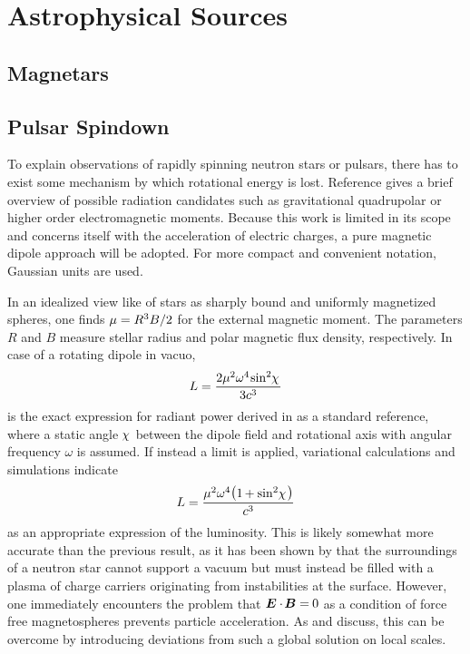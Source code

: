 \section{Astrophysical Sources}
\label{sec:sources}



\subsection{Magnetars}
\label{sub:magnetars}



\subsection{Pulsar Spindown}
\label{sub:spindown}

To explain observations of rapidly spinning neutron stars or pulsars, there has to exist some mechanism by which rotational energy is
lost. Reference \cite{Alvarez_2004} gives a brief overview of possible radiation candidates such as gravitational quadrupolar or
higher order electromagnetic moments. Because this work is limited in its scope and concerns itself with the acceleration of
electric charges, a pure magnetic dipole approach will be adopted. For more compact and convenient notation, Gaussian units are used.

In an idealized view like \cite{Deutsch_1955} of stars as sharply bound and uniformly magnetized spheres, one finds
$\mu = \kern-0.1pt R^3 B / 2$ for the external magnetic moment. The parameters $R$ and $B$ measure stellar radius and polar magnetic
flux density, respectively. In case of a rotating dipole in vacuo,
\begin{equation}
	L = \frac{2\mu^2 \omega^4 \kern-1.0pt \sin^2 \kern-2.0pt \chi \kern+1.0pt}{3c^3}
	\label{eqn:vacuum}
\end{equation}
is the exact expression for radiant power derived in \cite{Jackson_1999} as a standard reference, where a static angle
$\kern-1.0pt \chi \kern+1.0pt$ between the dipole field and rotational axis with angular frequency $\omega$ is assumed. If
instead a  limit is applied, variational calculations \cite{Gruzinov_2006} and  simulations
\cite{Spitkovsky_2006} indicate
\begin{equation}
	L = \frac{\mu^2 \omega^4 \raisebox{0.15ex}{\( \bigl(
	\raisebox{-0.15ex}{\( 1 \kern-0.7pt + \sin^2 \kern-2.0pt \chi \kern+1.0pt \)} \bigr) \)} }{c^3}
	\label{eqn:ffe-mhd}
\end{equation}
as an appropriate expression of the luminosity. This is likely somewhat more accurate than the previous result, as it has been
shown by \cite{Goldreich_1969} that the surroundings of a neutron star cannot support a vacuum but must instead be filled with a
plasma of charge carriers originating from instabilities at the surface. However, one immediately encounters the problem that
$\bm{E} \cdot \kern-1.0pt \bm{B} = \kern-0.5pt 0$ as a condition of force free magnetospheres prevents particle acceleration. As
\cite{Li_2012} and \cite{Gralla_2019} discuss, this can be overcome by introducing deviations from such a global solution on local
scales.


